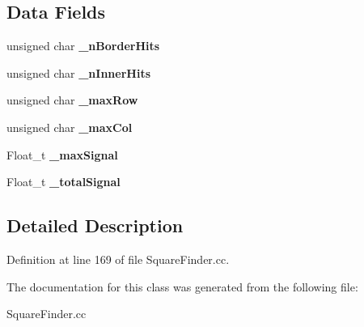 \subsection*{Data Fields}
\begin{DoxyCompactItemize}
\item 
unsigned char {\bfseries \_\-nBorderHits}\label{classCALICE_1_1WaferInfo__t_a621edca54c4166f865da90aa8b395ea7}

\item 
unsigned char {\bfseries \_\-nInnerHits}\label{classCALICE_1_1WaferInfo__t_a00278142ce3014e3c2f7d98202adcf80}

\item 
unsigned char {\bfseries \_\-maxRow}\label{classCALICE_1_1WaferInfo__t_a41c81c4926b86743f170e8faeadff528}

\item 
unsigned char {\bfseries \_\-maxCol}\label{classCALICE_1_1WaferInfo__t_a92af46b078ed24127a392ffe7aa27b05}

\item 
Float\_\-t {\bfseries \_\-maxSignal}\label{classCALICE_1_1WaferInfo__t_ac2a779dbfcccd850562e96b2fc397014}

\item 
Float\_\-t {\bfseries \_\-totalSignal}\label{classCALICE_1_1WaferInfo__t_ac0f78a4c015765f1d71de3d2a55d1ef0}

\end{DoxyCompactItemize}


\subsection{Detailed Description}


Definition at line 169 of file SquareFinder.cc.

The documentation for this class was generated from the following file:\begin{DoxyCompactItemize}
\item 
SquareFinder.cc\end{DoxyCompactItemize}
